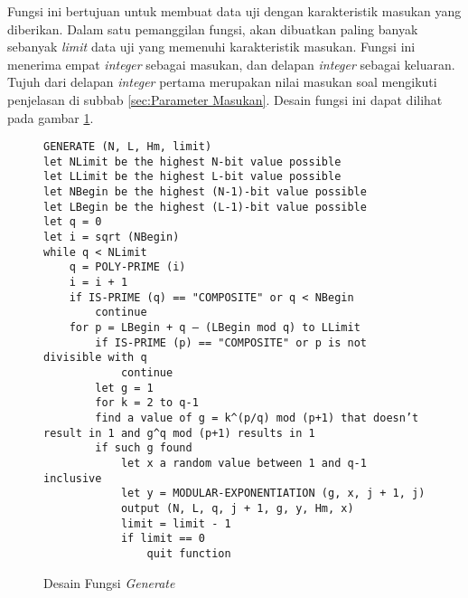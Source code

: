 Fungsi ini bertujuan untuk membuat data uji dengan karakteristik masukan yang diberikan. Dalam satu pemanggilan fungsi, akan dibuatkan paling banyak sebanyak \textit{limit} data uji yang memenuhi karakteristik masukan. Fungsi ini menerima empat \textit{integer} sebagai masukan, dan delapan \textit{integer} sebagai keluaran. Tujuh dari delapan \textit{integer} pertama merupakan nilai masukan soal mengikuti penjelasan di subbab \ref{sec:Parameter Masukan}. Desain fungsi ini dapat dilihat pada gambar \ref{psdo:generate}.
\begin{figure}[h!]
\begin{lstlisting}[firstnumber=0]
GENERATE (N, L, Hm, limit)
let NLimit be the highest N-bit value possible
let LLimit be the highest L-bit value possible
let NBegin be the highest (N-1)-bit value possible
let LBegin be the highest (L-1)-bit value possible
let q = 0
let i = sqrt (NBegin)
while q < NLimit
	q = POLY-PRIME (i)
	i = i + 1
	if IS-PRIME (q) == "COMPOSITE" or q < NBegin
		continue
	for p = LBegin + q – (LBegin mod q) to LLimit
		if IS-PRIME (p) == "COMPOSITE" or p is not divisible with q
			continue
		let g = 1
		for k = 2 to q-1
		find a value of g = k^(p/q) mod (p+1) that doesn’t result in 1 and g^q mod (p+1) results in 1
		if such g found
			let x a random value between 1 and q-1 inclusive
			let y = MODULAR-EXPONENTIATION (g, x, j + 1, j)
			output (N, L, q, j + 1, g, y, Hm, x)
			limit = limit - 1
			if limit == 0
				quit function
\end{lstlisting}
\caption{Desain Fungsi \textit{Generate}}
\label{psdo:generate}
\end{figure}